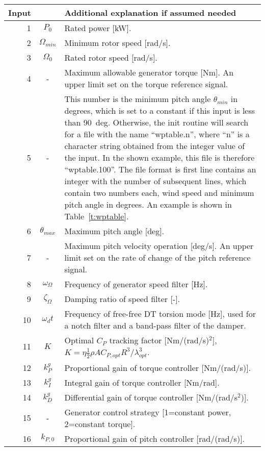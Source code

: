 \begin{table}[!htbp]
\begin{center}
\begin{tabular}{r|c|p{11.5cm}}
Input &  & Additional explanation if assumed needed \\ \hline
1 & $P_0$ 			& Rated power [kW].\\
2 & $\Omega_{min}$	& Minimum rotor speed [rad/s].\\
3 & $\Omega_0$ 		& Rated rotor speed [rad/s]. \\
4 & - 				& Maximum allowable generator torque [Nm]. An upper limit set on the torque reference signal. \\
5 & - 				& This number is the minimum pitch angle $\theta_{min}$ in degrees, which is set to a constant if this input is less than 90~deg. Otherwise, the init routine will search for a file with the name ``wptable.n'', where ``n'' is a character string obtained from the integer value of the input. In the shown example, this file is therefore ``wptable.100''. The file format is first line contains an integer with the number of subsequent lines, which contain two numbers each, wind speed and minimum pitch angle in degrees. An example is shown in Table~\ref{t:wptable}.\\
6 & $\theta_{max}$	& Maximum pitch angle [deg]. \\
7 & - 				& Maximum pitch velocity operation [deg/s]. An upper limit set on the rate of change of the pitch reference signal.\\
\hline
8 & $\omega_{\Omega}$ 	& Frequency of generator speed filter [Hz]. \\
9 & $\zeta_{\Omega}$ 	& Damping ratio of speed filter [-]. \\
10 & $\omega_dt$ 		& Frequency of free-free DT torsion mode [Hz], used for a notch filter and a band-pass filter of the damper. \\
\hline
11 & $K$ 			& Optimal $C_P$ tracking factor [Nm/(rad/s)$^2$], $K=\eta \frac12 \rho A C_{P,opt} R^3/\lambda_{opt}^3$. \\
12 & $k_P^g$ 		& Proportional gain of torque controller [Nm/(rad/s)]. \\
13 & $k_I^g$ 		& Integral gain of torque controller [Nm/rad]. \\
14 & $k_D^g$ 		& Differential gain of torque controller [Nm/(rad/s$^2$)]. \\
15 & - 			& Generator control strategy [1=constant power, 2=constant torque]. \\
16 & $k_{P,0}$ 		& Proportional gain of pitch controller [rad/(rad/s)]. \\

\end{tabular}
\end{center}
\end{table}
